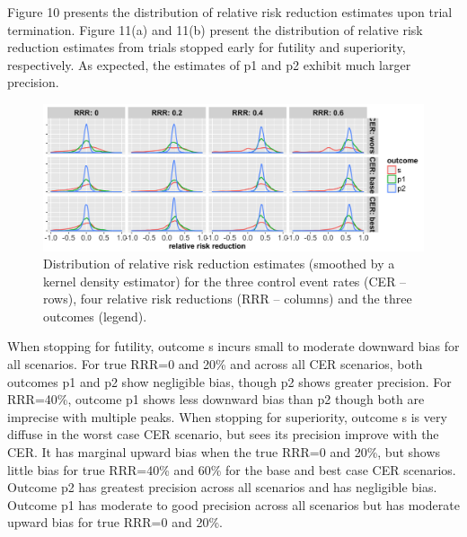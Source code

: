 \documentclass[]{article}
\begin{document}
Figure 10 presents the distribution of relative risk reduction estimates
upon trial termination. Figure 11(a) and 11(b) present the distribution
of relative risk reduction estimates from trials stopped early for
futility and superiority, respectively. As expected, the estimates of p1
and p2 exhibit much larger precision.

\begin{figure}
  \caption{Distribution of relative risk reduction estimates (smoothed by a kernel density estimator) for the three
  control event rates (CER – rows), four relative risk reductions (RRR – columns) and the three outcomes (legend).}
  \includegraphics{../plots/stop_p1_new/RRRhat_sim_05_stopp1_new.png}
\end{figure}

When stopping for futility, outcome s incurs small to moderate downward
bias for all scenarios. For true RRR=0 and 20\% and across all CER
scenarios, both outcomes p1 and p2 show negligible bias, though p2 shows
greater precision. For RRR=40\%, outcome p1 shows less downward bias
than p2 though both are imprecise with multiple peaks. When stopping for
superiority, outcome s is very diffuse in the worst case CER scenario,
but sees its precision improve with the CER. It has marginal upward bias
when the true RRR=0 and 20\%, but shows little bias for true RRR=40\%
and 60\% for the base and best case CER scenarios. Outcome p2 has
greatest precision across all scenarios and has negligible bias. Outcome
p1 has moderate to good precision across all scenarios but has moderate
upward bias for true RRR=0 and 20\%.
\end{document}
